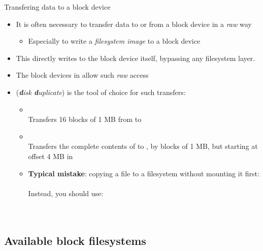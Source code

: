 \begin{frame}{Transfering data to a block device}
  \begin{itemize}
  \item It is often necessary to transfer data to or from a block
    device in a {\em raw} way
    \begin{itemize}
    \item Especially to write a {\em filesystem image} to a block
      device
    \end{itemize}
  \item This directly writes to the block device itself, bypassing any
    filesystem layer.
  \item The block devices in  allow such {\em raw} access
  \item {} ({\em {\bf d}isk {\bf d}uplicate})
    is the tool of choice for such transfers:
    \begin{itemize}
    \item {}\\
      Transfers 16 blocks of 1 MB from  to
    \item {}\\
      Transfers the complete contents of  to
      , by blocks of 1 MB, but starting at offset 4 MB
      in 
    \item {\bf Typical mistake}: copying a file to a filesystem without
      mounting it first:\\
      \\
      Instead, you should use:\\
      \\
      \\
    \end{itemize}
  \end{itemize}
\end{frame}

\subsection{Available block filesystems}

